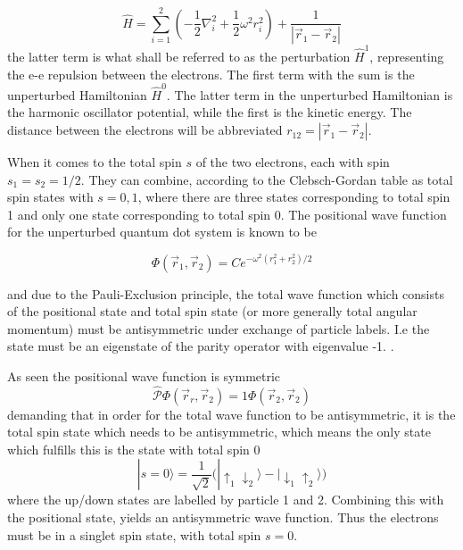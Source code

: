 \documentclass[aip,nobalancelastpage,
twocolumn,
rsi,%
 amsmath,amssymb,
 reprint,%
]{revtex4}
\begin{document}
\begin{equation}
\label{Hamiltonian}
\hat{H} = \sum_{i=1}^2\left( -\frac{1}{2}\nabla_i^2 + \frac{1}{2}\omega^2 r_i^2\right) +\frac{1}{\left|\vec{r}_1 - \vec{r}_2\right|}
\end{equation}
the latter term is what shall be referred to as the perturbation $\hat{H}^1$, representing the e-e repulsion between the electrons. The first term with the sum is the unperturbed Hamiltonian $\hat{H}^0$. The latter term in the unperturbed Hamiltonian is the harmonic oscillator potential, while the first is the kinetic energy. The distance between the electrons will be abbreviated $r_{12}=\left|\vec{r}_1-\vec{r}_2\right|$.\par
When it comes to the total spin $s$ of the two electrons, each with spin $s_1=s_2=1/2$. They can combine, according to the Clebsch-Gordan table as total spin states with $s=0,1$, where there are three states corresponding to total spin 1 and only one state corresponding to total spin 0. The positional wave function for the unperturbed quantum dot system is known to be

\large
\begin{equation*}
\Phi(\vec{r}_1,\vec{r}_2)=Ce^{-\omega^2(r_1^2+r_2^2)/2}
\end{equation*}
\normalsize

and due to the Pauli-Exclusion principle, the total wave function which consists of the positional state and total spin state (or more generally total angular momentum) must be antisymmetric under exchange of particle labels. I.e the state must be an eigenstate of the parity operator with eigenvalue -1. \cite[pg.128]{Zettili}. \par
As seen the positional wave function is symmetric 
\begin{equation}
\hat{\mathcal{P}}\Phi(\vec{r}_r,\vec{r}_2) = 1\Phi(\vec{r}_2,\vec{r}_2)
\end{equation}
demanding that in order for the total wave function to be antisymmetric, it is the total spin state which needs to be antisymmetric, which means the only state which fulfills this is the state with total spin 0
\begin{equation}
|s=0\rangle = \frac{1}{\sqrt{2}}\Big(|\uparrow_1 \downarrow_2\rangle - |\downarrow_1 \uparrow_2 \rangle \Big)
\end{equation}
where the up/down states are labelled by particle 1 and 2. Combining this with the positional state, yields an antisymmetric wave function. Thus the electrons must be in a singlet spin state, with total spin $s=0$.
\end{document}
